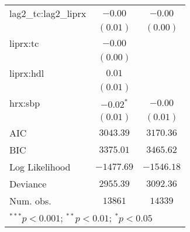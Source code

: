 \begin{tabular}{l c c}
lag2\_tc:lag2\_liprx  & $-0.00$       & $-0.00$       \\
                      & $(0.01)$      & $(0.00)$      \\
liprx:tc              & $-0.00$       &               \\
                      & $(0.00)$      &               \\
liprx:hdl             & $0.01$        &               \\
                      & $(0.01)$      &               \\
hrx:sbp               & $-0.02^{*}$   & $-0.00$       \\
                      & $(0.01)$      & $(0.01)$      \\
\midrule
AIC                   & $3043.39$     & $3170.36$     \\
BIC                   & $3375.01$     & $3465.62$     \\
Log Likelihood        & $-1477.69$    & $-1546.18$    \\
Deviance              & $2955.39$     & $3092.36$     \\
Num. obs.             & $13861$       & $14339$       \\
\bottomrule
\multicolumn{3}{l}{\scriptsize{$^{***}p<0.001$; $^{**}p<0.01$; $^{*}p<0.05$}}
\end{tabular}

